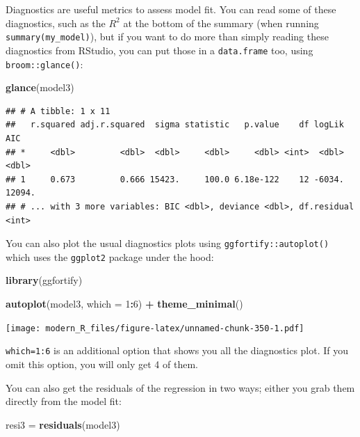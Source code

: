 \documentclass[]{gitbook}
\newenvironment{Shaded}{\begin{snugshade}}{\end{snugshade}}
\newcommand{\DataTypeTok}[1]{\textcolor[rgb]{0.13,0.29,0.53}{#1}}
\newcommand{\DecValTok}[1]{\textcolor[rgb]{0.00,0.00,0.81}{#1}}
\newcommand{\KeywordTok}[1]{\textcolor[rgb]{0.13,0.29,0.53}{\textbf{#1}}}
\newcommand{\NormalTok}[1]{#1}
\newcommand{\OperatorTok}[1]{\textcolor[rgb]{0.81,0.36,0.00}{\textbf{#1}}}
\newcommand{\StringTok}[1]{\textcolor[rgb]{0.31,0.60,0.02}{#1}}
\theoremstyle{definition}
\theoremstyle{definition}
\theoremstyle{definition}
\theoremstyle{remark}
\begin{document}
Diagnostics are useful metrics to assess model fit. You can read some of
these diagnostics, such as the \(R^2\) at the bottom of the summary
(when running \texttt{summary(my\_model)}), but if you want to do more
than simply reading these diagnostics from RStudio, you can put those in
a \texttt{data.frame} too, using \texttt{broom::glance()}:

\begin{Shaded}
\begin{Highlighting}[]
\KeywordTok{glance}\NormalTok{(model3)}
\end{Highlighting}
\end{Shaded}

\begin{verbatim}
## # A tibble: 1 x 11
##   r.squared adj.r.squared  sigma statistic   p.value    df logLik    AIC
## *     <dbl>         <dbl>  <dbl>     <dbl>     <dbl> <int>  <dbl>  <dbl>
## 1     0.673         0.666 15423.     100.0 6.18e-122    12 -6034. 12094.
## # ... with 3 more variables: BIC <dbl>, deviance <dbl>, df.residual <int>
\end{verbatim}

You can also plot the usual diagnostics plots using
\texttt{ggfortify::autoplot()} which uses the \texttt{ggplot2} package
under the hood:

\begin{Shaded}
\begin{Highlighting}[]
\KeywordTok{library}\NormalTok{(ggfortify)}

\KeywordTok{autoplot}\NormalTok{(model3, }\DataTypeTok{which =} \DecValTok{1}\OperatorTok{:}\DecValTok{6}\NormalTok{) }\OperatorTok{+}\StringTok{ }\KeywordTok{theme_minimal}\NormalTok{()}
\end{Highlighting}
\end{Shaded}

\texttt{[image: modern\_R\_files/figure-latex/unnamed-chunk-350-1.pdf]}

\texttt{which=1:6} is an additional option that shows you all the
diagnostics plot. If you omit this option, you will only get 4 of them.

You can also get the residuals of the regression in two ways; either you
grab them directly from the model fit:

\begin{Shaded}
\begin{Highlighting}[]
\NormalTok{resi3 =}\StringTok{ }\KeywordTok{residuals}\NormalTok{(model3)}
\end{Highlighting}
\end{Shaded}
\end{document}
